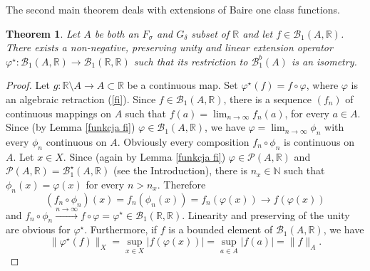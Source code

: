 \documentclass{amsart}
\newtheorem{Th}{Theorem}
\theoremstyle{definition}
\newcommand\mR{{\mathbb R}}
\newcommand\mN{{\mathbb N}}
\newcommand\B{{\mathscr B}}
\newcommand\PC{{\mathscr{P}}}
\newcommand\cn{\colon}
\newcommand\fs{F_\sigma}
\newcommand\gd{G_\delta}
\newcommand\fcb{\mathfrak{fcBor}}
\newcommand\fii{{\varphi}}
\begin{document}
The second main theorem deals with extensions of Baire one class functions.
\begin{Th}\label{rozsz_B1}
Let $A$ be both an $\fs$ and $\gd$ subset of $\mR$ and let $f\in\B_1(A,\mR)$.
There exists a non-negative, preserving unity and linear extension operator $\fii^{\star}\cn\B_1(A,\mR)\to\B_1(\mR,\mR)$
such that its restriction to $\B_1^b(A)$ is an isometry.
\end{Th}

\begin{proof}
Let $g\cn\mR\setminus A\to A\subset\mR$ be a continuous map.
Set $\fii^{\star}(f)=f\circ\fii$, where $\fii$ is an algebraic retraction (\ref{fi}).
Since $f\in\B_1(A,\mR)$, there is a sequence $\left(f_n\right)$ of continuous mappings on $A$ such that $f(a)=\lim_{n\to\infty}f_n(a)$, for every
$a\in A$. Since (by Lemma \ref{funkcja fi}) $\fii\in\B_1(A,\mR)$, we have $\fii=\lim_{n\to\infty}\phi_n$ with every $\phi_n$ continuous on $A$.
Obviously every composition $f_n\circ\phi_n$ is continuous on $A$. Let $x\in X$. Since (again by Lemma \ref{funkcja fi}) $\fii\in\PC(A,\mR)$ and 
$\PC(A,\mR)=\B_1^\star(A,\mR)$ (see the Introduction), there is  $n_x\in\mN$ such that $\phi_n(x)=\fii(x)$ for every $n>n_x$. Therefore
$$
\left(f_n\circ\phi_n\right)(x)=f_n\left(\phi_n(x)\right)=f_n\left(\fii(x)\right)\to f\left(\fii(x)\right)
$$
and $f_n\circ\phi_n\xrightarrow{n\to\infty}f\circ\fii=\fii^{\star}\in\B_1(\mR,\mR)$.
Linearity and preserving of the unity are obvious for $\fii^{\star}$.
Furthermore, if $f$ is a bounded element of $\B_1(A,\mR)$, we have
$$
\|\fii^{\star}(f)\|_X=\sup_{x\in X}|f\left(\fii(x)\right)|=\sup_{a\in A}|f(a)|=\|f\|_A.
$$
\end{proof}
\end{document}
